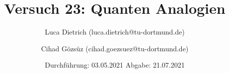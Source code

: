 

\subject{Fortgeschrittenenpraktikum der Fakultät Physik}
\title{Versuch 23: Quanten Analogien}
\author{Luca Dietrich (luca.dietrich@tu-dortmund.de) \and Cihad Gözsüz (cihad.goezsuez@tu-dortmund.de)}
\date{
  Durchführung: 03.05.2021
  \hspace{3em}
  Abgabe: 21.07.2021
}
\publishers{TU Dortmund – Fakultät Physik}



\maketitle
\thispagestyle{empty}
\tableofcontents
\newpage
\nocite{anleitung}





\newpage
\printbibliography{}
\nocite{matplotlib}
\nocite{seaborn}
\nocite{numpy}
\nocite{sympy}

